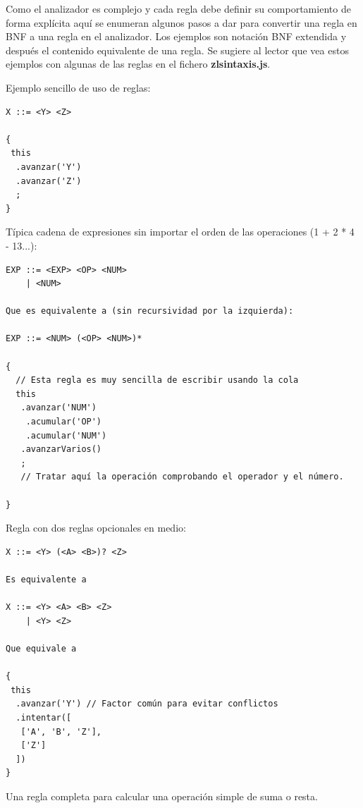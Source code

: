 \documentclass{report}
\begin{document}
	Como el analizador es complejo y cada regla debe definir su comportamiento de forma explícita aquí se enumeran algunos pasos a dar para convertir una regla en BNF a una regla en el analizador. Los ejemplos son notación BNF extendida y después el contenido equivalente de una regla. Se sugiere al lector que vea estos ejemplos con algunas de las reglas en el fichero \textbf{zlsintaxis.js}.
	
	\vspace{10px}
	
	Ejemplo sencillo de uso de reglas:
	
	\begin{BVerbatim}
X ::= <Y> <Z>

{
 this
  .avanzar('Y')
  .avanzar('Z')
  ;
}
	\end{BVerbatim}
	
	\vspace{10px}
	Típica cadena de expresiones sin importar el orden de las operaciones (1 + 2 * 4 - 13...):
	
	\begin{BVerbatim}
EXP ::= <EXP> <OP> <NUM>
    | <NUM>
    
Que es equivalente a (sin recursividad por la izquierda):

EXP ::= <NUM> (<OP> <NUM>)*    
 
{
  // Esta regla es muy sencilla de escribir usando la cola
  this
   .avanzar('NUM')
    .acumular('OP')
    .acumular('NUM')
   .avanzarVarios()
   ;
   // Tratar aquí la operación comprobando el operador y el número.
   
} 
	\end{BVerbatim}
	
	\vspace{10px}
	
	Regla con dos reglas opcionales en medio:
	
	\begin{BVerbatim}
X ::= <Y> (<A> <B>)? <Z>

Es equivalente a

X ::= <Y> <A> <B> <Z>
    | <Y> <Z>
    
Que equivale a

{
 this
  .avanzar('Y') // Factor común para evitar conflictos
  .intentar([
   ['A', 'B', 'Z'],
   ['Z']
  ])
}
	\end{BVerbatim}
	
	\vspace{10px}
	
	Una regla completa para calcular una operación simple de suma o resta.
	
\end{document}
